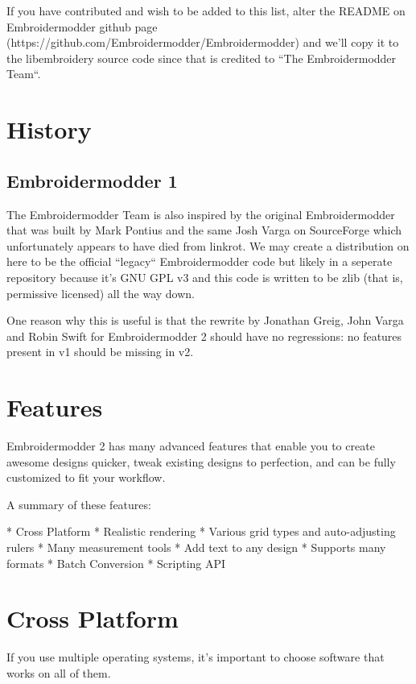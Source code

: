 \documentclass[a4paper]{report}
\begin{document}
If you have contributed and wish to be added to this list, alter the  README on Embroidermodder
github page (https://github.com/Embroidermodder/Embroidermodder) and we'll copy it to the
libembroidery source code since that is credited to ``The Embroidermodder Team``.



\section{History}

\subsection{Embroidermodder 1}

The Embroidermodder Team is also inspired by the original Embroidermodder that
was built by Mark Pontius and the same Josh Varga on SourceForge which
unfortunately appears to have died from linkrot. We may create a distribution
on here to be the official ``legacy`` Embroidermodder code but likely in a
seperate repository because it's GNU GPL v3 and this code is written to be
zlib (that is, permissive licensed) all the way down.

One reason why this is useful is that the rewrite by Jonathan Greig, John Varga
and Robin Swift for Embroidermodder 2 should have no regressions: no features
present in v1 should be missing in v2.

\section{Features}

Embroidermodder 2 has many advanced features that enable you to create awesome designs quicker, tweak existing designs to perfection, and can be fully customized to fit your workflow.

A summary of these features:

* Cross Platform
* Realistic rendering
* Various grid types and auto-adjusting rulers
* Many measurement tools
* Add text to any design
* Supports many formats
* Batch Conversion
* Scripting API

\section{Cross Platform}

If you use multiple operating systems, it's important to choose software that works on all of them.
\end{document}
